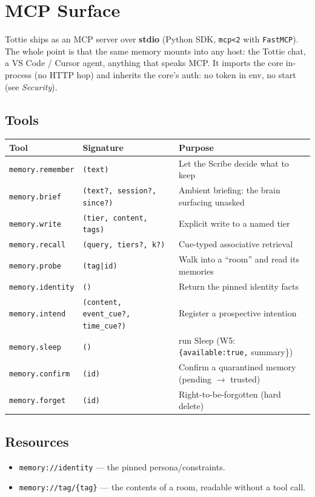 \chapter{MCP Surface}

Tottie ships as an MCP server over \textbf{stdio} (Python SDK, \texttt{mcp<2} with \texttt{FastMCP}).
The whole point is that the same memory mounts into any host: the Tottie chat, a VS Code / Cursor
agent, anything that speaks MCP. It imports the core in-process (no HTTP hop) and inherits
the core's auth: no token in env, no start (see \emph{Security}).

\section{Tools}
\begin{longtable}{@{}p{}p{}p{}@{}}
\toprule
Tool & Signature & Purpose \\
\midrule
\texttt{memory.remember} & \texttt{(text)} & Let the Scribe decide what to keep \\
\texttt{memory.brief} & \texttt{(text?, session?, since?)} & Ambient briefing: the brain surfacing unasked \\
\texttt{memory.write} & \texttt{(tier, content, tags)} & Explicit write to a named tier \\
\texttt{memory.recall} & \texttt{(query, tiers?, k?)} & Cue-typed associative retrieval \\
\texttt{memory.probe} & \texttt{(tag|id)} & Walk into a ``room'' and read its memories \\
\texttt{memory.identity} & \texttt{()} & Return the pinned identity facts \\
\texttt{memory.intend} & \texttt{(content, event\_cue?, time\_cue?)} & Register a prospective intention \\
\texttt{memory.sleep} & \texttt{()} & run Sleep (W5: \texttt{\{available:true,} summary\}) \\
\texttt{memory.confirm} & \texttt{(id)} & Confirm a quarantined memory (pending $\rightarrow$ trusted) \\
\texttt{memory.forget} & \texttt{(id)} & Right-to-be-forgotten (hard delete) \\
\bottomrule
\end{longtable}

\section{Resources}
\begin{itemize}
  \item \texttt{memory://identity} --- the pinned persona/constraints.
  \item \texttt{memory://tag/\{tag\}} --- the contents of a room, readable without a tool call.
\end{itemize}

